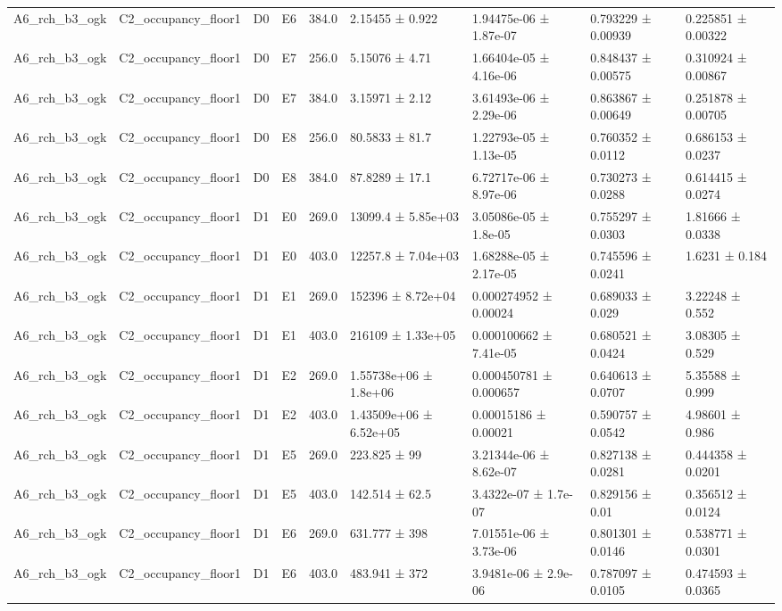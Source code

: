 \begin{table}
\begin{tabular}{lllllllll}
A6\_rch\_b3\_ogk & C2\_occupancy\_floor1 & D0 & E6 & 384.0 & 2.15455 ± 0.922 & 1.94475e-06 ± 1.87e-07 & 0.793229 ± 0.00939 & 0.225851 ± 0.00322 \\
A6\_rch\_b3\_ogk & C2\_occupancy\_floor1 & D0 & E7 & 256.0 & 5.15076 ± 4.71 & 1.66404e-05 ± 4.16e-06 & 0.848437 ± 0.00575 & 0.310924 ± 0.00867 \\
A6\_rch\_b3\_ogk & C2\_occupancy\_floor1 & D0 & E7 & 384.0 & 3.15971 ± 2.12 & 3.61493e-06 ± 2.29e-06 & 0.863867 ± 0.00649 & 0.251878 ± 0.00705 \\
A6\_rch\_b3\_ogk & C2\_occupancy\_floor1 & D0 & E8 & 256.0 & 80.5833 ± 81.7 & 1.22793e-05 ± 1.13e-05 & 0.760352 ± 0.0112 & 0.686153 ± 0.0237 \\
A6\_rch\_b3\_ogk & C2\_occupancy\_floor1 & D0 & E8 & 384.0 & 87.8289 ± 17.1 & 6.72717e-06 ± 8.97e-06 & 0.730273 ± 0.0288 & 0.614415 ± 0.0274 \\
A6\_rch\_b3\_ogk & C2\_occupancy\_floor1 & D1 & E0 & 269.0 & 13099.4 ± 5.85e+03 & 3.05086e-05 ± 1.8e-05 & 0.755297 ± 0.0303 & 1.81666 ± 0.0338 \\
A6\_rch\_b3\_ogk & C2\_occupancy\_floor1 & D1 & E0 & 403.0 & 12257.8 ± 7.04e+03 & 1.68288e-05 ± 2.17e-05 & 0.745596 ± 0.0241 & 1.6231 ± 0.184 \\
A6\_rch\_b3\_ogk & C2\_occupancy\_floor1 & D1 & E1 & 269.0 & 152396 ± 8.72e+04 & 0.000274952 ± 0.00024 & 0.689033 ± 0.029 & 3.22248 ± 0.552 \\
A6\_rch\_b3\_ogk & C2\_occupancy\_floor1 & D1 & E1 & 403.0 & 216109 ± 1.33e+05 & 0.000100662 ± 7.41e-05 & 0.680521 ± 0.0424 & 3.08305 ± 0.529 \\
A6\_rch\_b3\_ogk & C2\_occupancy\_floor1 & D1 & E2 & 269.0 & 1.55738e+06 ± 1.8e+06 & 0.000450781 ± 0.000657 & 0.640613 ± 0.0707 & 5.35588 ± 0.999 \\
A6\_rch\_b3\_ogk & C2\_occupancy\_floor1 & D1 & E2 & 403.0 & 1.43509e+06 ± 6.52e+05 & 0.00015186 ± 0.00021 & 0.590757 ± 0.0542 & 4.98601 ± 0.986 \\
A6\_rch\_b3\_ogk & C2\_occupancy\_floor1 & D1 & E5 & 269.0 & 223.825 ± 99 & 3.21344e-06 ± 8.62e-07 & 0.827138 ± 0.0281 & 0.444358 ± 0.0201 \\
A6\_rch\_b3\_ogk & C2\_occupancy\_floor1 & D1 & E5 & 403.0 & 142.514 ± 62.5 & 3.4322e-07 ± 1.7e-07 & 0.829156 ± 0.01 & 0.356512 ± 0.0124 \\
A6\_rch\_b3\_ogk & C2\_occupancy\_floor1 & D1 & E6 & 269.0 & 631.777 ± 398 & 7.01551e-06 ± 3.73e-06 & 0.801301 ± 0.0146 & 0.538771 ± 0.0301 \\
A6\_rch\_b3\_ogk & C2\_occupancy\_floor1 & D1 & E6 & 403.0 & 483.941 ± 372 & 3.9481e-06 ± 2.9e-06 & 0.787097 ± 0.0105 & 0.474593 ± 0.0365 \\

\end{tabular}
\end{table}

